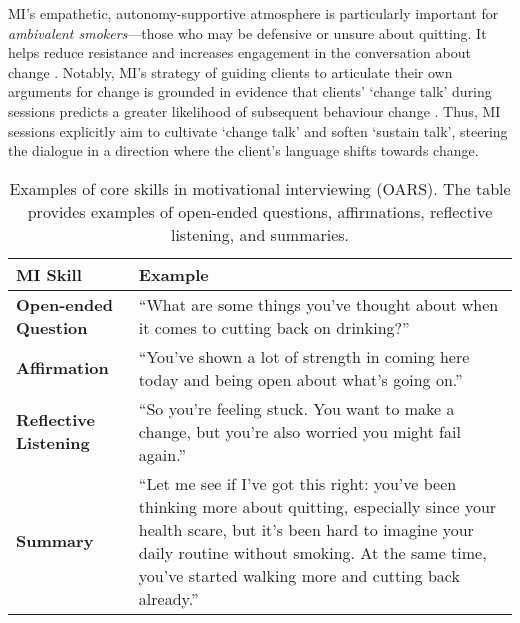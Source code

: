 MI’s empathetic, autonomy-supportive atmosphere is particularly important for \emph{ambivalent smokers}—those who may be defensive or unsure about quitting. It helps reduce resistance and increases engagement in the conversation about change \cite{Miller1983, MillerRollnick2023}. Notably, MI’s strategy of guiding clients to articulate their own arguments for change is grounded in evidence that clients’ ‘change talk’ during sessions predicts a greater likelihood of subsequent behaviour change \cite{MillerRose2009}. Thus, MI sessions explicitly aim to cultivate ‘change talk’ and soften ‘sustain talk’, steering the dialogue in a direction where the client’s language shifts towards change.



\begin{table}[ht!]
\centering
\begin{tabular}{@{} p{} p{} @{}}
\toprule
\textbf{MI Skill} & \textbf{Example} \\
\midrule
\textbf{Open-ended Question} & 
“What are some things you've thought about when it comes to cutting back on drinking?” \\
\addlinespace
\textbf{Affirmation} & 
“You've shown a lot of strength in coming here today and being open about what’s going on.” \\
\addlinespace
\textbf{Reflective Listening} & 
“So you're feeling stuck. You want to make a change, but you're also worried you might fail again.” \\
\addlinespace
\textbf{Summary} & 
“Let me see if I've got this right: you've been thinking more about quitting, especially since your health scare, but it's been hard to imagine your daily routine without smoking. At the same time, you’ve started walking more and cutting back already.” \\
\bottomrule
\end{tabular}
\caption[Examples of MI skills]{Examples of core skills in motivational interviewing (OARS). The table provides examples of open-ended questions, affirmations, reflective listening, and summaries.}
\label{tab:mi_skill_examples}
\end{table}




